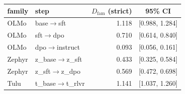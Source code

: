 \begin{tabular}{llrr}
\toprule
family & step & \multicolumn{1}{c}{$D_{\text{fam}}$ (strict)} & \multicolumn{1}{c}{95\% CI} \\
\midrule
OLMo & base$\to$sft & 1.118 & [0.988, 1.284] \\
OLMo & sft$\to$dpo & 0.710 & [0.614, 0.840] \\
OLMo & dpo$\to$instruct & 0.093 & [0.056, 0.161] \\
\midrule
Zephyr & z\_base$\to$z\_sft & 0.433 & [0.325, 0.584] \\
Zephyr & z\_sft$\to$z\_dpo & 0.569 & [0.472, 0.698] \\
\midrule
Tulu & t\_base$\to$t\_rlvr & 1.141 & [1.037, 1.260] \\
\bottomrule
\end{tabular}
